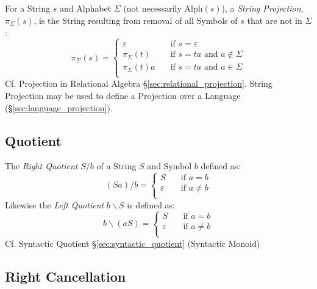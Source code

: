For a String $s$ and Alphabet $\Sigma$ (not necessarily
$\text{Alph}(s)$), a \emph{String Projection}, $\pi_{\Sigma}(s)$, is
the String resulting from removal of all Symbols of $s$ that are not
in $\Sigma$:
\[
  \pi_{\Sigma}(s) =
  \begin{cases}
    \varepsilon       & \quad \text{if $s = \varepsilon$}\\
    \pi_{\Sigma}(t)   & \quad \text{if $s = ta$ and $a \notin \Sigma$}\\
    \pi_{\Sigma}(t)a  & \quad \text{if $s = ta$ and $a \in \Sigma$}\\
  \end{cases}
\]
\fist Cf. Projection in Relational Algebra
\S\ref{sec:relational_projection}. String Projection may be used to
define a Projection over a Language (\S\ref{sec:language_projection}).



\subsection{Quotient}\label{sec:string_quotient}

The \emph{Right Quotient} $S / b$ of a String $S$ and Symbol $b$
defined as:
\[
  (Sa)/b =
  \begin{cases}
    S           & \quad \text{if $a = b$}\\
    \varepsilon & \quad \text{if $a \neq b$}\\
  \end{cases}
\]
Likewise the \emph{Left Quotient} $b \backslash S$ is defined as:
\[
  b\backslash(aS) =
  \begin{cases}
    S           & \quad \text{if $a = b$}\\
    \varepsilon & \quad \text{if $a \neq b$}\\
  \end{cases}
\]
\fist Cf. Syntactic Quotient \S\ref{sec:syntactic_quotient}
(Syntactic Monoid)



\subsection{Right Cancellation}\label{sec:right_cancellation}

